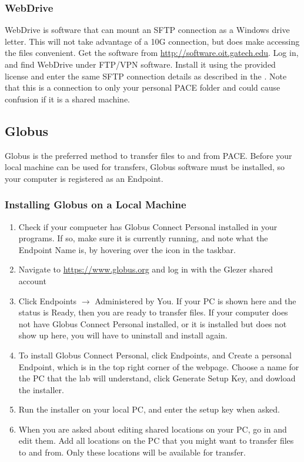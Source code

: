 \documentclass{article}
\begin{document}
	\subsubsection{WebDrive}
	\label{webdrive}
	WebDrive is software that can mount an SFTP connection as a Windows drive letter.  This will not take advantage of a 10G connection, but does make accessing the files convenient.  Get the software from \url{http://software.oit.gatech.edu}.  Log in, and find WebDrive under FTP/VPN software.  Install it using the provided license and enter the same SFTP connection details as described in the .  Note that this is a connection to only your personal PACE folder and could cause confusion if it is a shared machine.
	
	\subsection{Globus}
	Globus is the preferred method to transfer files to and from PACE.  Before your local machine can be used for transfers, Globus software must be installed, so your computer is registered as an Endpoint.
	
	\subsubsection{Installing Globus on a Local Machine}
    \begin{enumerate}
        \item Check if your compueter has Globus Connect Personal installed in your programs.  If so, make sure it is currently running, and note what the Endpoint Name is, by hovering over the icon in the taskbar.
	    \item Navigate to \url{https://www.globus.org} and log in with the Glezer shared account
	    \item Click Endpoints $\rightarrow$ Administered by You.  If your PC is shown here and the status is Ready, then you are ready to transfer files.  If your computer does not have Globus Connect Personal installed, or it is installed but does not show up here, you will have to uninstall and install again.
	    \item To install Globus Connect Personal, click Endpoints, and Create a personal Endpoint, which is in the top right corner of the webpage.  Choose a name for the PC that the lab will understand, click Generate Setup Key, and dowload the installer.
	    \item Run the installer on your local PC, and enter the setup key when asked.
	    \item When you are asked about editing shared locations on your PC, go in and edit them.  Add all locations on the PC that you might want to transfer files to and from.  Only these locations will be available for transfer.
	\end{enumerate}
	
\end{document}
